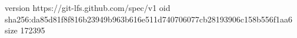 version https://git-lfs.github.com/spec/v1
oid sha256:da85d81f8f816b23949b963b616e511d740706077cb28193906c158b556f1aa6
size 172395
